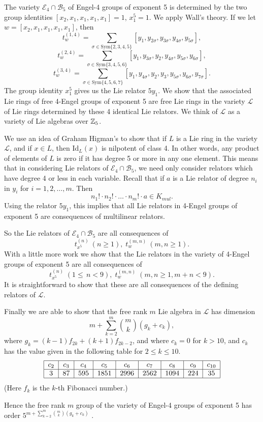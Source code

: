 \documentclass[12pt]{article}
\begin{document}
The variety $\mathcal{E}_4\cap \mathcal{B}_5$ of Engel-4 groups of exponent
5 is determined by the two group identities $[x_2,x_1,x_1,x_1,x_1]=1$, $%
x_1^5=1$. We apply Wall's theory. If we let $w=[x_2,x_1,x_1,x_1,x_1]$, then 
\[
t_w^{(1,4)}=\sum_{\sigma \in \text{Sym}\{2,3,4,5\}}[y_1,y_{2\sigma
},y_{3\sigma },y_{4\sigma },y_{5\sigma }],
\]
\[
t_w^{(2,4)}=\sum_{\sigma \in \text{Sym}\{3,4,5,6\}}[y_1,y_{3\sigma
},y_2,y_{4\sigma },y_{5\sigma },y_{6\sigma }],
\]
\[
t_w^{(3,4)}=\sum_{\sigma \in \text{Sym}\{4,5,6,7\}}[y_1,y_{4\sigma
},y_2,y_3,y_{5\sigma },y_{6\sigma },y_{7\sigma }].
\]
The group identity $x_1^5$ gives us the Lie relator $5y_1$. We show that 
{\Large the associated Lie rings of free 4-Engel groups of exponent 5 are
free Lie rings in the variety $\mathcal{L}$ of Lie rings determined by these
4 identical Lie relators.} We think of $\mathcal{L}$ as a variety of Lie
algebras over $\Bbb{Z}_5$.

We use an idea of Graham Higman's to show that if $L$ is a Lie ring in the
variety $\mathcal{L}$, and if $x\in L$, then Id$_L(x)$ is nilpotent of class
4. In other words, any product of elements of $L$ is zero if it has degree 5
or more in any one element. This means that in considering Lie relators of $%
\mathcal{E}_4\cap \mathcal{B}_5$, we need only consider relators which have
degree 4 or less in each variable. Recall that if $a$ is a Lie relator of
degree $n_i$ in $y_i$ for $i=1,2,\ldots ,m$. Then 
\[
n_1!\cdot n_2!\cdot \ldots \cdot n_m!\cdot a\in K_{mul}. 
\]
Using the relator $5y_1$, this implies that {\Large all Lie relators in
4-Engel groups of exponent 5 are consequences of multilinear relators.}

So the Lie relators of $\mathcal{E}_4\cap \mathcal{B}_5$ are all
consequences of {\Large 
\[
t_{x^5}^{(n)}\ (n\geq 1),\;t_w^{(m,n)}\ (m,n\geq 1).
\]
} With a little more work we show that the Lie relators in the variety of
4-Engel groups of exponent 5 are all consequences of {\Large 
\[
t_{x^5}^{(n)}\;(1\leq \,n<9),\;t_w^{(m,n)}\;(m,n\geq 1,m+n<9).
\]
} It is straightforward to show that these are all consequences of the
defining relators of $\mathcal{L}$.

Finally we are able to show that the free rank $m$ Lie algebra in $\mathcal{L%
}$ has dimension 
\[
m+\sum_{k=2}^m\binom mk(g_k+c_k), 
\]
where $g_k=(k-1)f_{2k}+(k+1)f_{2k-2}$, and where $c_k=0$ for $k>10$, and $%
c_k $ has the value given in the following table for $2\leq k\leq 10$. 
\[
\begin{tabular}{|c|c|c|c|c|c|c|c|c|}
\hline
$c_2$ & $c_3$ & $c_4$ & $c_5$ & $c_6$ & $c_7$ & $c_8$ & $c_9$ & $c_{10}$ \\ 
\hline
3 & 87 & 595 & 1851 & 2996 & 2562 & 1094 & 224 & 35 \\ \hline
\end{tabular}
\]
(Here $f_k$ is the $k$-th Fibonacci number.)

{\Large Hence the free rank $m$ group of the variety of Engel-4 groups of
exponent 5 has order $5^{m+\sum_{k=2}^m\binom mk(g_k+c_k)}$ .}
\end{document}
